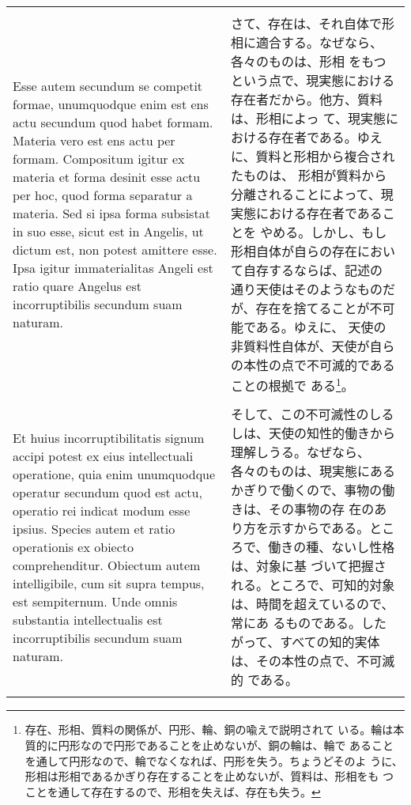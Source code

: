 \documentclass[10pt]{jsarticle} %
\begin{document}
\begin{longtable}{p{21em}p{21em}}
\\\\

Esse autem secundum se competit formae, unumquodque enim est ens actu
secundum quod habet formam. Materia vero est ens actu per
formam. Compositum igitur ex materia et forma desinit esse actu per
hoc, quod forma separatur a materia. Sed si ipsa forma subsistat in
suo esse, sicut est in Angelis, ut dictum est, non potest amittere
esse. Ipsa igitur immaterialitas Angeli est ratio quare Angelus est
incorruptibilis secundum suam naturam.



&

 さて、存在は、それ自体で形相に適合する。なぜなら、各々のものは、形相
をもつという点で、現実態における存在者だから。他方、質料は、形相によっ
て、現実態における存在者である。ゆえに、質料と形相から複合されたものは、
形相が質料から分離されることによって、現実態における存在者であることを
やめる。しかし、もし形相自体が自らの存在において自存するならば、記述の
通り天使はそのようなものだが、存在を捨てることが不可能である。ゆえに、
天使の非質料性自体が、天使が自らの本性の点で不可滅的であることの根拠で
ある\footnote{存在、形相、質料の関係が、円形、輪、銅の喩えで説明されて
いる。輪は本質的に円形なので円形であることを止めないが、銅の輪は、輪で
あることを通して円形なので、輪でなくなれば、円形を失う。ちょうどそのよ
うに、形相は形相であるかぎり存在することを止めないが、質料は、形相をも
つことを通して存在するので、形相を失えば、存在も失う。}。

\\\\

Et huius incorruptibilitatis signum accipi potest
ex eius intellectuali operatione, quia enim unumquodque operatur
secundum quod est actu, operatio rei indicat modum esse ipsius. Species
autem et ratio operationis ex obiecto comprehenditur. Obiectum autem
intelligibile, cum sit supra tempus, est sempiternum. Unde omnis
substantia intellectualis est incorruptibilis secundum suam naturam.


&


そして、この不可滅性のしるしは、天使の知性的働きから理解しうる。なぜなら、
 各々のものは、現実態にあるかぎりで働くので、事物の働きは、その事物の存
 在のあり方を示すからである。ところで、働きの種、ないし性格は、対象に基
 づいて把握される。ところで、可知的対象は、時間を超えているので、常にあ
 るものである。したがって、すべての知的実体は、その本性の点で、不可滅的
 である。

\\\\



\end{longtable}
\end{document}

